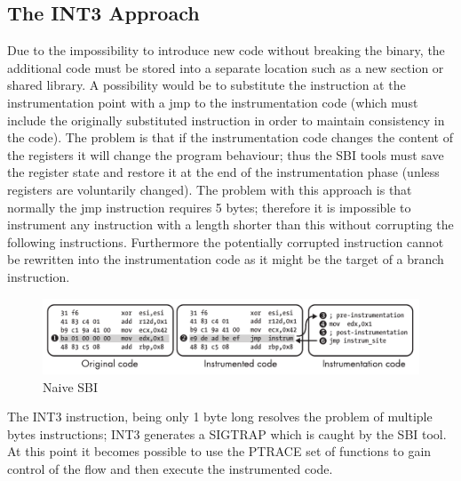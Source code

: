 \subsection{The INT3 Approach}
Due to the impossibility to introduce new code without breaking the binary, the additional code must be stored into a
separate location such as a new section or shared library. A possibility would be to substitute the instruction at the
instrumentation point with a {\ttfamily jmp} to the instrumentation code (which must include the originally substituted
instruction in order to maintain consistency in the code). The problem is that if the instrumentation code changes the
content of the registers it will change the program behaviour; thus the SBI tools must save the register state and
restore it at the end of the instrumentation phase (unless registers are voluntarily changed). The problem with this
approach is that normally the {\ttfamily jmp} instruction requires 5 bytes; therefore it is impossible to instrument any
instruction with a length shorter than this without corrupting the following instructions. Furthermore the potentially
corrupted instruction cannot be rewritten into the instrumentation code as it might be the target of a branch
instruction.
\begin{figure}[!htbp]
    \begin{center}
        \includegraphics[scale=0.5]{./pics/naive_SBI.png}
        \caption{Naive SBI}
        \label{naive_SBI}
    \end{center}
\end{figure}
The {\ttfamily INT3} instruction, being only 1 byte long resolves the problem of multiple bytes instructions; {\ttfamily
INT3} generates a {\ttfamily SIGTRAP} which is caught by the SBI tool. At this point it becomes possible to use the
{\ttfamily PTRACE} set of functions to gain control of the flow and then execute the instrumented code.


